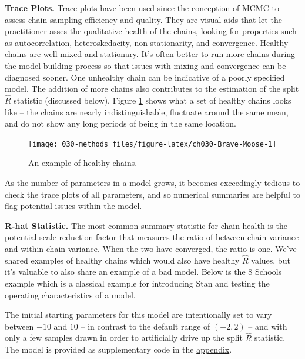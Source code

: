 \documentclass[11pt, oneside, openany]{scrbook}
\begin{document}
\textbf{Trace Plots.} Trace plots have been used since the conception of MCMC to assess chain sampling efficiency and quality. They are visual aids that let the practitioner asses the qualitative health of the chains, looking for properties such as autocorrelation, heteroskedacity, non-stationarity, and convergence. Healthy chains are well-mixed and stationary. It's often better to run more chains during the model building process so that issues with mixing and convergence can be diagnosed sooner. One unhealthy chain can be indicative of a poorly specified model. The addition of more chains also contributes to the estimation of the split \(\hat{R}\) statistic (discussed below). Figure \ref{fig:ch030-Brave-Moose} shows what a set of healthy chains looks like -- the chains are nearly indistinguishable, fluctuate around the same mean, and do not show any long periods of being in the same location.

\begin{figure}

{\centering \texttt{[image: 030-methods\_files/figure-latex/ch030-Brave-Moose-1]} 

}

\caption{An example of healthy chains.}\label{fig:ch030-Brave-Moose}
\end{figure}

As the number of parameters in a model grows, it becomes exceedingly tedious to check the trace plots of all parameters, and so numerical summaries are helpful to flag potential issues within the model.

\textbf{R-hat Statistic.} The most common summary statistic for chain health is the potential scale reduction factor \citep{gelman1992inference} that measures the ratio of between chain variance and within chain variance. When the two have converged, the ratio is one. We've shared examples of healthy chains which would also have healthy \(\hat{R}\) values, but it's valuable to also share an example of a bad model. Below is the 8 Schools example \citep{gelman2013bayesian} which is a classical example for introducing Stan and testing the operating characteristics of a model.

The initial starting parameters for this model are intentionally set to vary between \(-10\) and \(10\) -- in contrast to the default range of \((-2, 2)\) -- and with only a few samples drawn in order to artificially drive up the split \(\hat{R}\) statistic. The model is provided as supplementary code in the \protect\hyperlink{code}{appendix}.
\end{document}
